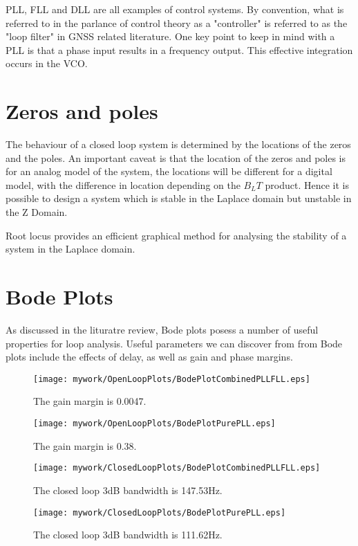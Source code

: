 \ac{PLL}, \ac{FLL} and \ac{DLL} are all examples of control systems. By convention, what is referred to in the parlance of control theory as a "controller" is referred to as the "loop filter" in \ac{GNSS} related literature. One key point to keep in mind with a \ac{PLL} is that a phase input results in a frequency output. This effective integration occurs in the \ac{VCO}.

\section{Zeros and poles}
The behaviour of a closed loop system is determined by the locations of the zeros and the poles. An important caveat is that the location of the zeros and poles is for an analog model of the system, the locations will be different for a digital model, with the difference in location depending on the $B_LT$ product.  Hence it is possible to design a system which is stable in the Laplace domain but unstable in the Z Domain. 

Root locus provides an efficient graphical method for analysing the stability of a system in the Laplace domain\cite{Nise}. 

\section{Bode Plots}

As discussed in the lituratre review, Bode plots posess a number of useful properties for loop analysis. Useful parameters we can discover from from Bode plots include the effects of delay, as well as gain and phase margins. 

\begin{figure}[!htb] 
    \centering
    \texttt{[image: mywork/OpenLoopPlots/BodePlotCombinedPLLFLL.eps]} 
    \label{fig:BodePlotCombinedOpenLoop}
    \caption{The gain margin is 0.0047.}
\end{figure}

\begin{figure}[!htb] 
    \centering
    \texttt{[image: mywork/OpenLoopPlots/BodePlotPurePLL.eps]} 
    \label{fig:BodePlotPurePLLOpenLoop}
    \caption{The gain margin is 0.38.}
\end{figure}

\begin{figure}[!htb] 
    \centering
    \texttt{[image: mywork/ClosedLoopPlots/BodePlotCombinedPLLFLL.eps]} 
    \label{fig:BodePlotCombinedClosedLoop}
    \caption{The closed loop 3dB bandwidth is 147.53Hz.}
\end{figure}

\begin{figure}[!htb] 
    \centering
    \texttt{[image: mywork/ClosedLoopPlots/BodePlotPurePLL.eps]} 
    \label{fig:BodePlotPurePLLClosedLoop}
    \caption{The closed loop 3dB bandwidth is 111.62Hz.}
\end{figure}






